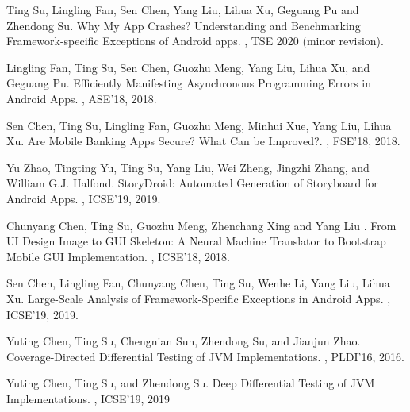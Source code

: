 \documentclass[a4paper]{article}
\begin{document}
\begin{thebibliography}{99}
	\newblock Ting Su, Lingling Fan, Sen Chen, Yang Liu, Lihua Xu, Geguang Pu and Zhendong Su.
	\newblock Why My App Crashes? Understanding and Benchmarking
	Framework-specific Exceptions of Android apps. 
	, TSE 2020 (minor revision).
	
	\newblock Lingling Fan, Ting Su, Sen Chen, Guozhu Meng, Yang Liu, Lihua Xu, and Geguang Pu.
	\newblock Efficiently Manifesting Asynchronous Programming Errors in Android Apps.
	, ASE'18, 2018.
	
	\newblock Sen Chen, Ting Su, Lingling Fan, Guozhu Meng, Minhui Xue, Yang Liu, Lihua Xu.
	\newblock Are Mobile Banking Apps Secure? What Can be Improved?.
	, FSE'18, 2018.
	
	\newblock Yu Zhao, Tingting Yu, Ting Su, Yang Liu, Wei Zheng, Jingzhi Zhang, and William G.J. Halfond.
	\newblock StoryDroid: Automated Generation of Storyboard for Android Apps.
	, ICSE'19, 2019.
	
	\newblock Chunyang Chen, Ting Su, Guozhu Meng, Zhenchang Xing and Yang Liu .
	\newblock From UI Design Image to GUI Skeleton: A Neural Machine Translator to Bootstrap Mobile GUI Implementation.
	, ICSE'18, 2018.
	
	\newblock Sen Chen, Lingling Fan, Chunyang Chen, Ting Su, Wenhe Li, Yang Liu, Lihua Xu.
	\newblock Large-Scale Analysis of Framework-Specific Exceptions in Android Apps.
	, ICSE'19, 2019.
	
	\newblock Yuting Chen, Ting Su, Chengnian Sun, Zhendong Su, and Jianjun Zhao.  
	\newblock Coverage-Directed Differential Testing of JVM Implementations.
	, PLDI'16, 2016.
	
	\newblock Yuting Chen, Ting Su, and Zhendong Su.
	\newblock Deep Differential Testing of JVM Implementations.
	, ICSE'19, 2019
	

\end{thebibliography}
\end{document}
